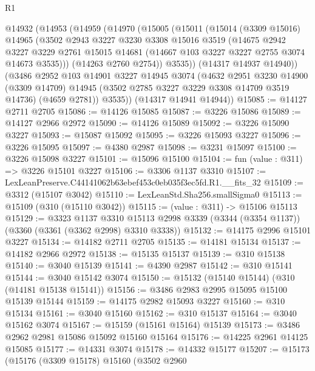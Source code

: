 \begin{lexlean}{R1}
\begin{coremodule}
  @14932
    (@14953
      (@14959
        (@14970
          (@15005
            (@15011
              (@15014
                (@3309 @15016)
                @14965
                (@3502
                  @2943
                  @3227
                  @3230
                  @3308
                  @15016
                  @3519
                  (@14675
                    @2942
                    @3227
                    @3229
                    @2761
                    @15015
                    @14681
                    (@14667 @103 @3227 @3227 @2755 @3074 @14673 @3535)))
                (@14263 @2760 @2754))
              @3535))
          (@14317 @14937 @14940))
        (@3486
          @2952
          @103
          @14901
          @3227
          @14945
          @3074
          (@4632
            @2951
            @3230
            @14900
            (@3309 @14709)
            @14945
            (@3502 @2785 @3227 @3229 @3308 @14709 @3519 @14736)
            (@4659 @2781))
          @3535))
      (@14317 @14941 @14944))
@15085 := @14127 @2711 @2705
@15086 := @14126 @15085
@15087 := @3226 @15086
@15089 := @14127 @2966 @2972
@15090 := @14126 @15089
@15092 := @3226 @15090 @3227
@15093 := @15087 @15092
@15095 := @3226 @15093 @3227
@15096 := @3226 @15095
@15097 := @4380 @2987
@15098 := @3231 @15097
@15100 := @3226 @15098 @3227
@15101 := @15096 @15100
@15104 := fun (value : @311) => @3226 @15101 @3227
@15106 := @3306 @1137 @3310
@15107 := LexLeanPreserve.C44141062b63ebef453c0eb035f3ec5fd.R1.__fits_32
@15109 := @3312 (@15107 @3042)
@15110 := LexLeanStd.Sha256.smallSigma0
@15113 := @15109 (@310 (@15110 @3042))
@15115 := (value : @311) -> @15106 @15113
@15129 := @3323
    @1137
    @3310
    @15113
    @2998
    @3339
    (@3344 (@3354 @1137))
    (@3360 (@3361 (@3362 @2998) @3310 @3338))
@15132 := @14175 @2996 @15101 @3227
@15134 := @14182 @2711 @2705
@15135 := @14181 @15134
@15137 := @14182 @2966 @2972
@15138 := @15135 @15137
@15139 := @310 @15138
@15140 := @3040 @15139
@15141 := @4390 @2987
@15142 := @310 @15141
@15144 := @3040 @15142 @3074
@15150 := @15132 (@15140 @15144) (@310 (@14181 @15138 @15141))
@15156 := @3486 @2983 @2995 @15095 @15100 @15139 @15144
@15159 := @14175 @2982 @15093 @3227
@15160 := @310 @15134
@15161 := @3040 @15160
@15162 := @310 @15137
@15164 := @3040 @15162 @3074
@15167 := @15159 (@15161 @15164) @15139
@15173 := @3486 @2962 @2981 @15086 @15092 @15160 @15164
@15176 := @14225 @2961 @14125 @15085
@15177 := @14331 @3074
@15178 := @14332 @15177
@15207 := @15173
    (@15176
      (@3309 @15178)
      @15160
      (@3502
        @2960

\end{coremodule}
\end{lexlean}
